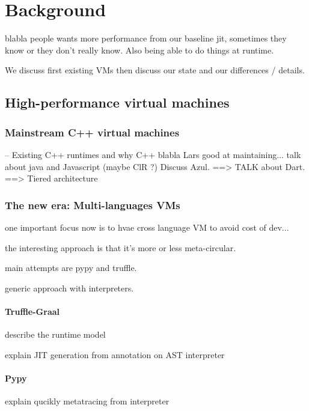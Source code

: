 \documentclass[a4paper,12pt,twoside]{../includes/ThesisStyle}
\begin{document}
\fi

\chapter{Background}
\label{chap:background}
\minitoc

blabla people wants more performance from our baseline jit, sometimes they know or they don't really know.
Also being able to do things at runtime.

We discuss first existing VMs then discuss our state and our differences / details. 

\section{High-performance virtual machines}

\subsection{Mainstream C++ virtual machines}
-- Existing C++ runtimes and why C++ blabla Lars good at maintaining...
talk about java and Javascript (maybe ClR ?) Discuss Azul.
==> TALK about Dart.
==> Tiered architecture

\subsection{The new era: Multi-languages VMs}

one important focus now is to hvae cross language VM to avoid cost of dev...

the interesting approach is that it's more or less meta-circular.

main attempts are pypy and truffle.

generic approach with interpreters.

\subsubsection{Truffle-Graal}

describe the runtime model

explain JIT generation from annotation on AST interpreter

\subsubsection{Pypy}

explain qucikly metatracing from interpreter
\end{document}
